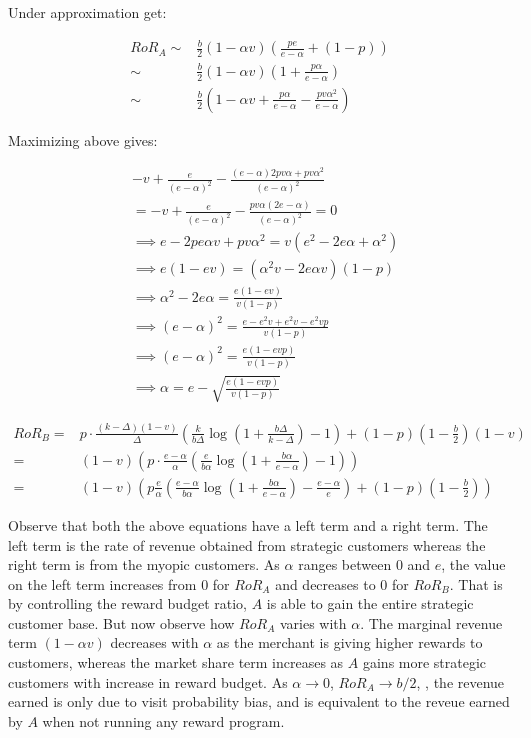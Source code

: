 Under approximation get:

\begin{align*}
RoR_A \sim & \frac{b}{2}(1-\alpha v)\left(\frac{pe}{e-\alpha} + (1-p)\right)\\
      \sim & \frac{b}{2}(1-\alpha v) \left(1 + \frac{p\alpha}{e-\alpha}\right)\\
       \sim & \frac{b}{2}\left(1-\alpha v + \frac{p\alpha}{e-\alpha} - \frac{pv\alpha^2}{e-\alpha}\right)
\end{align*}

Maximizing above gives:

\begin{align*}
& -v + \frac{e}{(e-\alpha)^2} - \frac{(e-\alpha)2pv\alpha + pv\alpha^2}{(e-\alpha)^2}\\
&= -v + \frac{e}{(e-\alpha)^2} - \frac{pv\alpha(2e-\alpha)}{(e-\alpha)^2} = 0\\
&\implies e - 2pe\alpha v + pv\alpha^2 = v(e^2 - 2e\alpha + \alpha^2)\\
&\implies e(1-ev) = (\alpha^2 v - 2e\alpha v)(1-p)\\
&\implies \alpha^2 - 2e\alpha = \frac{e(1-ev)}{v(1-p)}\\
&\implies (e-\alpha)^2 = \frac{e - e^2v + e^2 v - e^2 vp}{v(1-p)}\\
&\implies (e-\alpha)^2 = \frac{e(1-evp)}{v(1-p)}\\
&\implies \alpha = e - \sqrt{\frac{e(1-evp)}{v(1-p)}}
\end{align*}

\begin{align*}
RoR_B =& p\cdot\frac{(k-\Delta)(1-v)}{\Delta}\left(\frac{k}{b\Delta}\log\left(1+\frac{b\Delta}{k-\Delta}\right) - 1\right) + (1-p)(1-\frac{b}{2})(1-v)\\
      =& (1-v)\left(p\cdot\frac{e-\alpha}{\alpha}\left(\frac{e}{b\alpha}\log\left(1+\frac{b\alpha}{e-\alpha}\right) - 1\right)\right)\\
      =& (1-v)\left(p\frac{e}{\alpha}\left(\frac{e-\alpha}{b\alpha}\log\left(1+\frac{b\alpha}{e-\alpha}\right) - \frac{e-\alpha}{e}\right) + (1-p)(1-\frac{b}{2})\right)
\end{align*}

Observe that both the above equations have a left term and a right term. The left term is the rate of revenue obtained from strategic customers whereas the right term is from the myopic customers.
As $\alpha$ ranges between $0$ and $e$, the value on the left term increases from $0$ for $RoR_A$ and decreases to $0$ for $RoR_B$.
That is by controlling the reward budget ratio, $A$ is able to gain the entire strategic customer base.
But now observe how $RoR_A$ varies with $\alpha$.
The marginal revenue term $(1-\alpha v)$ decreases with $\alpha$ as the merchant is giving higher rewards to customers, whereas the market share term increases as $A$ gains more strategic customers with increase in reward budget.
As $\alpha \to 0$, $RoR_A \to b/2$, \ie, the revenue earned is only due to visit probability bias, and is equivalent to the reveue earned by $A$ when not running any reward program.

